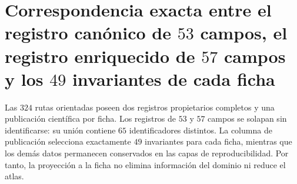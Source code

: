 \section{Correspondencia exacta entre el registro canónico de \(53\) campos, el registro enriquecido de \(57\) campos y los \(49\) invariantes de cada ficha}
\label{sec:correspondencia-atlas-53-57-49-sucesor}

Las \(324\) rutas orientadas poseen dos registros propietarios completos y
una publicación científica por ficha. Los registros de \(53\) y \(57\)
campos se solapan sin identificarse: su unión contiene \(65\) identificadores
distintos. La columna de publicación selecciona exactamente \(49\) invariantes
para cada ficha, mientras que los demás datos permanecen conservados en las
capas de reproducibilidad. Por tanto, la proyección a la ficha no elimina
información del dominio ni reduce el atlas.

